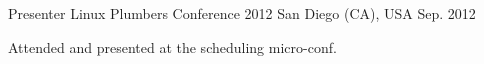 

\begin{cventries}

%
%
  \cventry
    {Presenter} %
    {Linux Plumbers Conference 2012} %
    {San Diego (CA), USA} %
    {Sep. 2012} %
    {
      \begin{cvitems} %
        \item {Attended and presented at the scheduling micro-conf.}
      \end{cvitems}
    }


\end{cventries}
